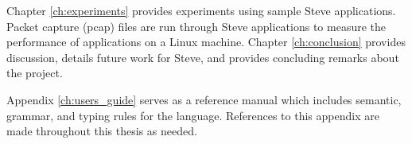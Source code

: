 Chapter \ref{ch:experiments} provides experiments using sample Steve
applications. Packet capture (pcap) files are run through Steve applications to measure the performance of applications on a Linux machine.
Chapter \ref{ch:conclusion} provides discussion, details future work for Steve, and provides concluding remarks about the project.

Appendix \ref{ch:users_guide} serves as a reference
manual which includes semantic, grammar, and typing rules for the language. References to this appendix are made throughout this thesis as needed.
